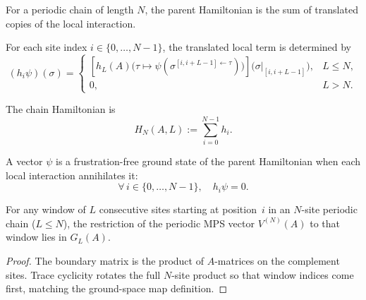 For a periodic chain of length $N$, the parent Hamiltonian is the sum of
translated copies of the local interaction.

\begin{definition}\label{def:local_term_parent}
    \leanok
    For each site index $i \in \{0,\ldots,N{-}1\}$, the translated local term is
    determined by
    \[
        (h_i\psi)(\sigma)
        =
        \begin{cases}
            \left[
                h_L(A)
                \bigl(\tau\mapsto
                \psi(\sigma^{[i,i+L-1]\leftarrow\tau})\bigr)
            \right]\!\bigl(\sigma|_{[i,i+L-1]}\bigr), & L \le N, \\
            0,                                        & L > N.
        \end{cases}
    \]
\end{definition}

\begin{definition}\label{def:parent_hamiltonian}
    \leanok
    The chain Hamiltonian is
    \[
        H_N(A,L) := \sum_{i=0}^{N-1} h_i.
    \]
\end{definition}

\begin{definition}\label{def:is_frustration_free}
    \leanok
    A vector $\psi$ is a frustration-free ground state of the parent Hamiltonian
    when each local interaction annihilates it:
    \[
        \forall\, i \in \{0,\ldots,N{-}1\},\quad h_i \psi = 0.
    \]
\end{definition}

\begin{lemma}\label{lem:mpv_window_mem_ground_space}
    \leanok
    For any window of $L$ consecutive sites starting at position~$i$ in an
    $N$-site periodic chain ($L \le N$), the restriction of the periodic MPS
    vector $V^{(N)}(A)$ to that window lies in $G_L(A)$.
\end{lemma}

\begin{proof}
    \leanok
    The boundary matrix is the product of $A$-matrices on the complement sites.
    Trace cyclicity rotates the full $N$-site product so that window
    indices come first, matching the ground-space map definition.
\end{proof}

